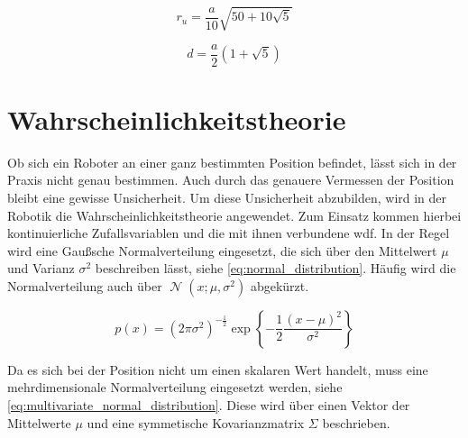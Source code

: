 \begin{equation}
r_u = \frac{a}{10} \sqrt{50 + 10 \sqrt{5}} \label{eq:fuenfeck_umkreisradius}
\end{equation}

\begin{equation}
d = \frac{a}{2} \left(1 + \sqrt{5} \right) \label{eq:fuenfeck_diagonale}
\end{equation}


%
%
\section{Wahrscheinlichkeitstheorie}
\label{sec:probability_theory}

Ob sich ein Roboter an einer ganz bestimmten Position befindet, lässt sich in der Praxis nicht genau bestimmen. Auch durch das genauere Vermessen der Position bleibt eine gewisse Unsicherheit. Um diese Unsicherheit abzubilden, wird in der Robotik die Wahrscheinlichkeitstheorie angewendet. Zum Einsatz kommen hierbei kontinuierliche Zufallsvariablen und die mit ihnen verbundene \Gls{wdf}. In der Regel wird eine Gaußsche Normalverteilung eingesetzt, die sich über den Mittelwert $\mu$ und Varianz $\sigma^2$ beschreiben lässt, siehe \autoref{eq:normal_distribution}. Häufig wird die Normalverteilung auch über $\operatorname{\mathcal{N}}{(x; \mu, \sigma^2)}$ abgekürzt.

\begin{equation}
p(x) = \left( 2 \pi \sigma^2 \right)^{-\frac12}  \exp{ \left\{ -\frac12 \frac{(x - \mu)^2}{\sigma^2} \right\} } \label{eq:normal_distribution}
\end{equation}

Da es sich bei der Position nicht um einen skalaren Wert handelt, muss eine mehrdimensionale Normalverteilung eingesetzt werden, siehe \autoref{eq:multivariate_normal_distribution}. Diese wird über einen Vektor der Mittelwerte $\mu$ und eine symmetische Kovarianzmatrix $\Sigma$ beschrieben.

